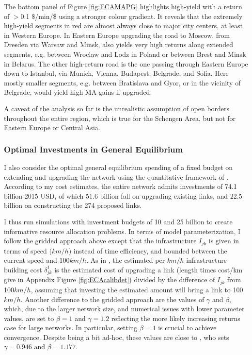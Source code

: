 \documentclass[a4paper]{article}
\begin{document}
The bottom panel of Figure \ref{fig:ECAMAPG} highlights high-yield with a return of $>$0.1 \$/min/\$ using a stronger colour gradient. It reveals that the extremely high-yield segments in red are almost always close to major city centers, at least in Western Europe. In Eastern Europe upgrading the road to Moscow, from Dresden via Warsaw and Minsk, also yields very high returns along extended segments, e.g. between Wroclaw and Lodz in Poland or between Brest and Minsk in Belarus. The other high-return road is the one passing through Eastern Europe down to Istanbul, via Munich, Vienna, Budapest, Belgrade, and Sofia. Here mostly smaller segments, e.g. between Bratislava and Gyor, or in the vicinity of Belgrade, would yield high MA gains if upgraded. \newline 

A caveat of the analysis so far is the unrealistic assumption of open borders throughout the entire region, which is true for the Schengen Area, but not for Eastern Europe or Central Asia. %

\subsubsection*{Optimal Investments in General Equilibrium}

I also consider the optimal general equilibrium spending of a fixed budget on extending and upgrading the network using the quantitative framework of \citet{fajgelbaum2020optimal}. According to my cost estimates, the entire network admits investments of 74.1 billion 2015 USD, of which 51.6 billion fall on upgrading existing links, and 22.5 billion on constructing the 274 proposed links. \newline 

I thus run simulations with investment budgets of 10 and 25 billion to create informative resource allocation problems. In terms of model parameterization, I follow the gridded approach above except that the infrastructure $I_{jk}$ is given in terms of speed ($km/h$) instead of time efficiency, and bounded between the current speed and 100$km/h$. As in \citet{krantz2024optimal}, the estimated per-$km/h$ infrastructure building cost $\delta^I_{jk}$ is the estimated cost of upgrading a link (length times cost/km give in Appendix Figure \ref{fig:ECAcalibdet}) divided by the difference of $I_{jk}$ from 100$km/h$, assuming that investing the estimated amount will bring a link to 100$km/h$. Another difference to the gridded approach are the values of $\gamma$ and $\beta$, which, due to the larger network size, and numerical issues with lower parameter values, are set to $\beta = 1$ and $\gamma = 1.2$ reflecting the more likely increasing returns case for large networks. In particular, setting $\beta = 1$ is crucial to achieve convergence. Despite being a bit ad-hoc, these values are close to \citet{graff2024spatial}, who sets $\gamma = 0.946$ and $\beta = 1.177$. \newline 
\end{document}
